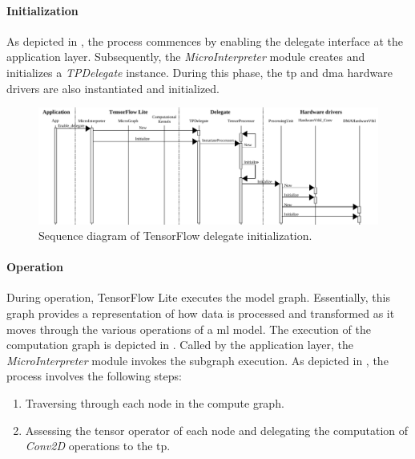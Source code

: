 \paragraph{Initialization}

As depicted in , the process commences by enabling the delegate interface at the application layer. Subsequently, the \textit{MicroInterpreter} module creates and initializes a \textit{TPDelegate} instance. During this phase, the \gls{tp} and \gls{dma} hardware drivers are also instantiated and initialized.

\begin{figure}[h!]
	\centering
	\includegraphics[width=\textwidth]{./figures/sequence_tfl_delegate_initialization.pdf}
	\caption{Sequence diagram of TensorFlow delegate initialization.}
	\label{fig:sw_tf_delegate_initialize_diagram}
\end{figure}
\FloatBarrier

\paragraph{Operation}
During operation, TensorFlow Lite executes the model graph. Essentially, this graph provides a representation of how data is processed and transformed as it moves through the various operations of a \gls{ml} model. 
The execution of the computation graph is depicted in . Called by the application layer, the \textit{MicroInterpreter} module invokes the subgraph execution. As depicted in , the process involves the following steps:

\begin{enumerate}
	\item Traversing through each node in the compute graph.
	\item Assessing the tensor operator of each node and delegating the computation of \textit{Conv2D} operations to the \gls{tp}.
\end{enumerate}

